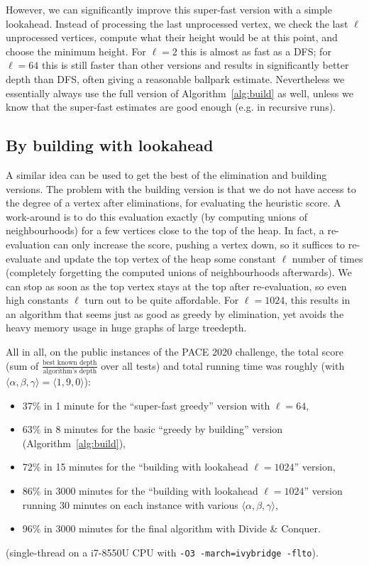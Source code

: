\documentclass{timgad}
\begin{document}
However, we can significantly improve this super-fast version with a simple lookahead.
Instead of processing the last unprocessed vertex, we check the last $\ell$ unprocessed vertices, compute what their height would be at this point, and choose the minimum height.
For $\ell=2$ this is almost as fast as a DFS;
for $\ell=64$ this is still faster than other versions and results in significantly better depth than DFS, often giving a reasonable ballpark estimate.
Nevertheless we essentially always use the full version of Algorithm~\ref{alg:build} as well, unless we know that the super-fast estimates are good enough (e.g. in recursive runs).

\subsection{By building with lookahead}
A similar idea can be used to get the best of the elimination and building versions.
The problem with the building version is that we do not have access to the degree of a vertex after eliminations, for evaluating the heuristic score.
A work-around is to do this evaluation exactly (by computing unions of neighbourhoods) for a few vertices close to the top of the heap.
In fact, a re-evaluation can only increase the score, pushing a vertex down,
so it suffices to re-evaluate and update the top vertex of the heap some constant $\ell$ number of times (completely forgetting the computed unions of neighbourhoods afterwards).
We can stop as soon as the top vertex stays at the top after re-evaluation, so even high constants $\ell$ turn out to be quite affordable.
For $\ell=1024$, this results in an algorithm that seems just as good as greedy by elimination, yet avoids the heavy memory usage in huge graphs of large treedepth.

All in all, on the public instances of the PACE 2020 challenge, the total score (sum of $\frac{\text{best known depth}}{\text{algorithm's depth}}$ over all tests) and total running time was roughly (with $\langle\alpha,\beta,\gamma\rangle=\langle 1,9,0\rangle$):
\begin{itemize}
\item 37\% in 1 minute for the ``super-fast greedy'' version with $\ell=64$,\\
\item 63\% in 8 minutes for the basic ``greedy by building'' version (Algorithm~\ref{alg:build}),\\
\item 72\% in 15 minutes for the ``building with lookahead $\ell=1024$'' version,\\
\item 86\% in 3000 minutes for the ``building with lookahead $\ell=1024$'' version running 30 minutes on each instance with various $\langle\alpha,\beta,\gamma\rangle$,\\
\item 96\% in 3000 minutes for the final algorithm with Divide \& Conquer.
\end{itemize}
(single-thread on a i7-8550U CPU with \texttt{-O3 -march=ivybridge -flto}).
\end{document}
